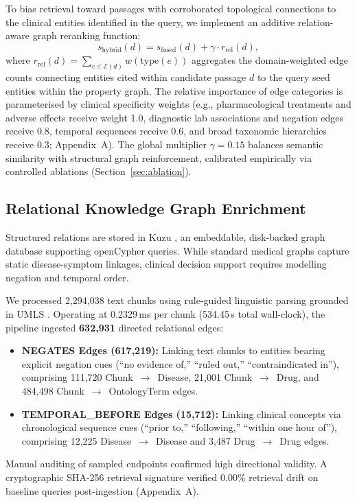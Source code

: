 \documentclass[preprint,12pt,a4paper]{elsarticle}
\begin{document}
To bias retrieval toward passages with corroborated topological connections
to the clinical entities identified in the query, we implement an additive relation-aware
graph reranking function:
\begin{equation}
  s_{\text{hybrid}}(d) = s_{\text{fused}}(d) + \gamma \cdot r_{\text{rel}}(d),
  \label{eq:rerank}
\end{equation}
where $r_{\text{rel}}(d) = \sum_{e \in \mathcal{E}(d)} w(\text{type}(e))$ aggregates the
domain-weighted edge counts connecting entities cited within candidate passage $d$ to
the query seed entities within the property graph. The relative importance of edge categories
is parameterised by clinical specificity weights (e.g., pharmacological treatments and
adverse effects receive weight 1.0, diagnostic lab associations and negation edges receive
0.8, temporal sequences receive 0.6, and broad taxonomic hierarchies receive 0.3; Appendix~A).
The global multiplier $\gamma=0.15$ balances semantic similarity with structural graph
reinforcement, calibrated empirically via controlled ablations (Section~\ref{sec:ablation}).

\subsection{Relational Knowledge Graph Enrichment}
\label{sec:graph}

Structured relations are stored in Kuzu \citep{nakamura2022kuzu}, an embeddable,
disk-backed graph database supporting openCypher queries. While standard medical graphs
capture static disease-symptom linkages, clinical decision support requires modelling
negation and temporal order.

We processed 2,294,038 text chunks using rule-guided linguistic parsing grounded in
UMLS \citep{bodenreider2004umls}. Operating at 0.2329\,ms per chunk (534.45\,s total
wall-clock), the pipeline ingested \textbf{632,931} directed relational edges:
\begin{itemize}
  \item \textbf{NEGATES Edges (617,219):} Linking text chunks to entities
        bearing explicit negation cues (``no evidence of,'' ``ruled out,''
        ``contraindicated in''), comprising 111,720 Chunk~$\to$~Disease, 21,001
        Chunk~$\to$~Drug, and 484,498 Chunk~$\to$~OntologyTerm edges.
  \item \textbf{TEMPORAL\_BEFORE Edges (15,712):} Linking clinical concepts
        via chronological sequence cues (``prior to,'' ``following,'' ``within one
        hour of''), comprising 12,225 Disease~$\to$~Disease and 3,487 Drug~$\to$~Drug edges.
\end{itemize}
Manual auditing of sampled endpoints confirmed high directional validity.
A cryptographic SHA-256 retrieval signature verified 0.00\% retrieval drift on
baseline queries post-ingestion (Appendix~A).
\end{document}
